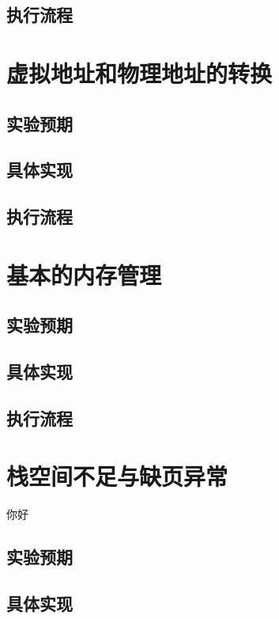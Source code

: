 \subsection{执行流程}

\section{虚拟地址和物理地址的转换}

\subsection{实验预期}

\subsection{具体实现}

\subsection{执行流程}

\section{基本的内存管理}

\subsection{实验预期}

\subsection{具体实现}

\subsection{执行流程}

\section{栈空间不足与缺页异常}
你好
\subsection{实验预期}

\subsection{具体实现}

